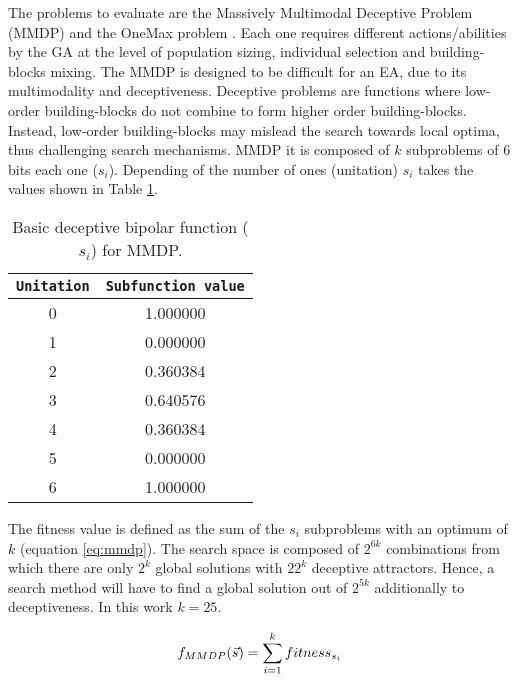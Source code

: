 \documentclass{sig-alternate}
\begin{document}
The problems to evaluate are the Massively Multimodal Deceptive Problem (MMDP) \cite{goldberg92massive} and the OneMax problem \cite{ONEMAX}. Each one requires different actions/abilities by the GA at the level of population sizing, individual selection and building-blocks mixing. The MMDP
 is designed to be difficult for an EA, due to
its multimodality and deceptiveness. Deceptive problems are functions where low-order building-blocks do not combine to form higher order building-blocks. Instead, low-order building-blocks may mislead the search towards local optima, thus challenging search mechanisms. MMDP it is composed of $k$ subproblems of 6 bits each one ($s_i$). Depending of
the number of ones (unitation) $s_i$ takes the values shown in Table \ref{table:mmdp}.  

\begin{table}[h]

\centering
{%
\caption{ Basic deceptive bipolar function ($s_i$) for MMDP.}
\begin{tabular}{|c|c|}
\hline
\texttt{Unitation}&\texttt{Subfunction value}\\
\hline
0 & 1.000000 \\
\hline
1 & 0.000000 \\
\hline
2 & 0.360384 \\
\hline
3 & 0.640576\\
\hline
4 & 0.360384\\
\hline
5 & 0.000000\\
\hline
6 & 1.000000\\
\hline

\end{tabular}
}

\label{table:mmdp}
\end{table}



The fitness value is defined as the sum of the $s_i$ subproblems with an optimum of $k$ (equation \ref{eq:mmdp}).
The search space is composed of $2^{6k}$ combinations from which there
are only $2^k$ global solutions with $22^k$ deceptive
attractors. Hence, a search method will have to find a global solution
out of $2^{5k}$ additionally to deceptiveness. In this work $k=25$. 

\begin{equation}\label{eq:mmdp}
\scriptsize
f_{MMDP}(\vec s)= \sum_{i=1}^{k} fitness_{s_i}
\end{equation}\\
\end{document}
